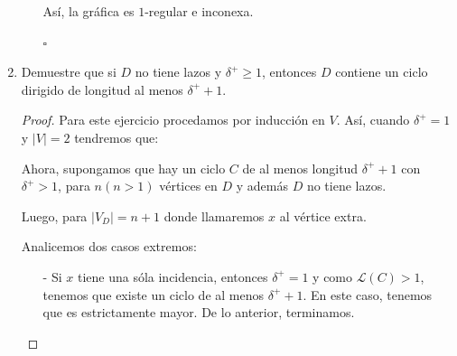 \documentclass{article}
\begin{document}
\begin{enumerate}
\begin{enumerate}
      \begin{figure}[ht!]
        \centering
      \end{figure}

      Así, la gráfica es $1$-regular e inconexa.

      \hfill $\square$
  \end{enumerate}

  \item Demuestre que si $D$ no tiene lazos y $\delta^+ \ge 1$, entonces $D$
    contiene un ciclo dirigido de longitud al menos $\delta^+ + 1$.

    \renewcommand\qedsymbol{QED}
    \begin{proof}
      Para este ejercicio procedamos por inducción en $V$.
      Así, cuando $\delta^+ = 1$ y $|V| = 2$ tendremos que:

      \begin{center}
      \end{center}

      Ahora, supongamos que hay un ciclo $C$ de al menos longitud $\delta^+ +1$
      con $\delta^+ > 1$, para $n(n > 1)$ vértices en $D$ y además $D$ no
      tiene lazos.

      Luego, para $|V_D| = n +1$ donde llamaremos $x$ al vértice
      extra.

      Analicemos dos casos extremos:

      \begin{itemize}
        \item[-] Si $x$ tiene una sóla incidencia, entonces $\delta^+ = 1$ y como
          $\mathcal{L}(C) > 1$, tenemos que existe un ciclo de al menos $\delta^+ +1$.
          En este caso, tenemos que es estrictamente mayor.
          De lo anterior, terminamos.


\end{itemize}
\end{proof}
\end{enumerate}
\end{document}
